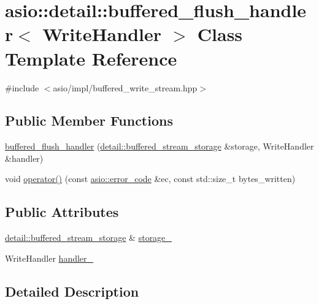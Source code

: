 \hypertarget{classasio_1_1detail_1_1buffered__flush__handler}{}\section{asio\+:\+:detail\+:\+:buffered\+\_\+flush\+\_\+handler$<$ Write\+Handler $>$ Class Template Reference}
\label{classasio_1_1detail_1_1buffered__flush__handler}


{\ttfamily \#include $<$asio/impl/buffered\+\_\+write\+\_\+stream.\+hpp$>$}

\subsection*{Public Member Functions}
\begin{DoxyCompactItemize}
\item 
\hyperlink{classasio_1_1detail_1_1buffered__flush__handler_a34d6e0fdefbb5aa8e6781be624cdcea7}{buffered\+\_\+flush\+\_\+handler} (\hyperlink{classasio_1_1detail_1_1buffered__stream__storage}{detail\+::buffered\+\_\+stream\+\_\+storage} \&storage, Write\+Handler \&handler)
\item 
void \hyperlink{classasio_1_1detail_1_1buffered__flush__handler_a1e8b8426c8c2f180937e74445878a1cc}{operator()} (const \hyperlink{classasio_1_1error__code}{asio\+::error\+\_\+code} \&ec, const std\+::size\+\_\+t bytes\+\_\+written)
\end{DoxyCompactItemize}
\subsection*{Public Attributes}
\begin{DoxyCompactItemize}
\item 
\hyperlink{classasio_1_1detail_1_1buffered__stream__storage}{detail\+::buffered\+\_\+stream\+\_\+storage} \& \hyperlink{classasio_1_1detail_1_1buffered__flush__handler_af3c17bfdba4ed3f2ce790665ef49faf1}{storage\+\_\+}
\item 
Write\+Handler \hyperlink{classasio_1_1detail_1_1buffered__flush__handler_a22590ea7765e35375d76e7fe39b48aff}{handler\+\_\+}
\end{DoxyCompactItemize}


\subsection{Detailed Description}
